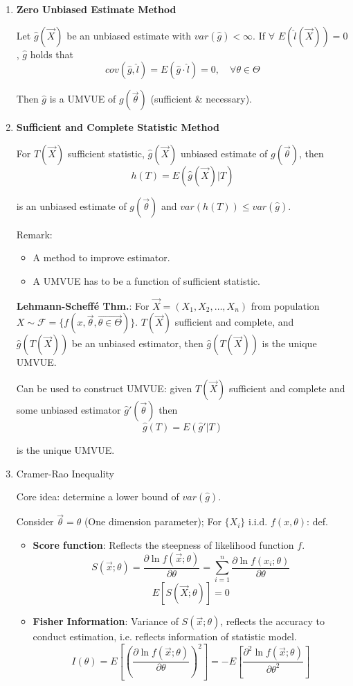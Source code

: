 \documentclass[11pt,a4paper]{ctexart}
\numberwithin{equation}{section}%
\begin{document}
\begin{enumerate}
\item \textbf{Zero Unbiased Estimate Method}
            
    Let $\hat{g}(\vec{X})$ be an unbiased estimate with $var(\hat{g})<\infty$. If $\forall$ $E(\hat{l}(\vec{X}))=0$ , $\hat{g}$ holds that
    \[
        cov(\hat{g},\hat{l})=E(\hat{g}\cdot\hat{l})=0,\quad\forall\theta\in\Theta    
    \]

    Then $\hat{g}$ is a UMVUE of $g(\vec{\theta})$ (sufficient \& necessary).





\item \textbf{Sufficient and Complete Statistic Method}

    For $T(\vec{X})$ sufficient statistic, $\hat{g}(\vec{X})$ unbiased estimate of $g(\vec{\theta})$, then 
\[
    h(T)=E(\hat{g}(\vec{X})| T)    
\]

    is an unbiased estimate of $g(\vec{\theta})$ and $var(h(T))\leq var(\hat{g})$.

    Remark:
    \begin{itemize}
        \item A method to improve estimator.
        \item A UMVUE has to be a function of sufficient statistic.
    \end{itemize}

    \textbf{Lehmann-Scheffé Thm.}: For $\vec{X}=(X_1,X_2,\ldots,X_n)$ from population $X\sim\mathscr{F}=\{f(x,\vec{\theta},\vec{\theta\in\Theta})\}$. $T(\vec{X})$ sufficient and complete, and $\hat{g}(T(\vec{X}))$ be an unbiased estimator, then $\hat{g}(T(\vec{X}))$ is the unique UMVUE.

    Can be used to construct UMVUE: given $T(\vec{X})$ sufficient and complete and some unbiased estimator $\hat{g}\prime(\vec{\theta})$ then 
    \[
        \hat{g}(T)=E(\hat{g}\prime|T)    
    \]

    is the unique UMVUE.



\item Cramer-Rao Inequality

    Core idea: determine a lower bound of $var(\hat{g})$.

    Consider $\vec{\theta}=\theta$ (One dimension parameter); For $\{X_i\}$ i.i.d. $f(x,\theta)$: def.
    \begin{itemize}
        \item \textbf{Score function}: Reflects the steepness of likelihood function $f$.
        \[
            S(\vec{x};\theta)=\frac{\partial\ln f(\vec{x};\theta)}{\partial\theta}=\sum_{i=1}^n\frac{\partial\ln f(x_i;\theta)}{\partial\theta}
        \]
        \[E[S(\vec{X};\theta)]=0\]
        \item \textbf{Fisher Information}: Variance of $S(\vec{x};\theta)$, reflects the accuracy to conduct estimation, i.e. reflects information of statistic model.
        \[
            I(\theta)=E\left[\left(\frac{\partial \ln f(\vec{x};\theta)}{\partial\theta}\right)^2\right]=-E\left[\frac{\partial^2\ln f(\vec{x};\theta)}{\partial \theta^2}\right]
        \]
    \end{itemize}


\end{enumerate}
\end{document}
